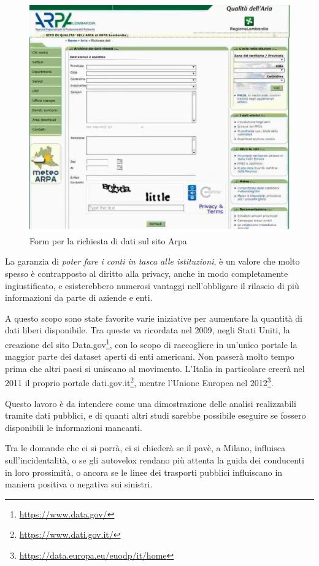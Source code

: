 \documentclass[a4paper,12pt]{report}
\newcommand{\quotestyle}[1]{\textit{#1}}
\newcommand{\skipline}{\vspace{0.2in}}
\begin{document}
\begin{figure}
    \hfill\includegraphics[width=0.7\linewidth]{img/arpa.png}\hspace*{\fill}
    \caption{Form per la richiesta di dati sul sito Arpa}
\end{figure}

La garanzia di \quotestyle{poter fare i conti in tasca alle istituzioni}, è un 
valore che molto spesso è contrapposto al diritto alla privacy, anche in 
modo completamente ingiustificato, e esisterebbero numerosi vantaggi nell'obbligare 
il rilascio di più informazioni da parte di aziende e enti. 

A questo scopo sono state favorite varie iniziative per aumentare la quantità di 
dati liberi disponibile. 
Tra queste va ricordata nel 2009, negli Stati Uniti, la creazione del sito 
Data.gov\footnote{\url{https://www.data.gov/}}, 
con lo scopo di raccogliere in un'unico portale la maggior parte dei dataset 
aperti di enti americani. 
Non passerà molto tempo prima che altri paesi si uniscano al movimento. 
L'Italia in particolare creerà nel 2011 il proprio portale 
dati.gov.it\footnote{\url{https://www.dati.gov.it/}}, mentre l'Unione Europea nel 
2012\footnote{\url{https://data.europa.eu/euodp/it/home}}.

\skipline
Questo lavoro è da intendere come una dimostrazione delle analisi realizzabili 
tramite dati pubblici, e di quanti altri studi sarebbe possibile eseguire se fossero 
disponibili le informazioni mancanti.

Tra le domande che ci si porrà, ci si chiederà se il pavè, a Milano, 
influisca sull'incidentalità, o se gli autovelox rendano più attenta 
la guida dei conducenti in loro prossimità, o ancora se le linee dei trasporti pubblici 
influiscano in maniera positiva o negativa sui sinistri.
\end{document}
